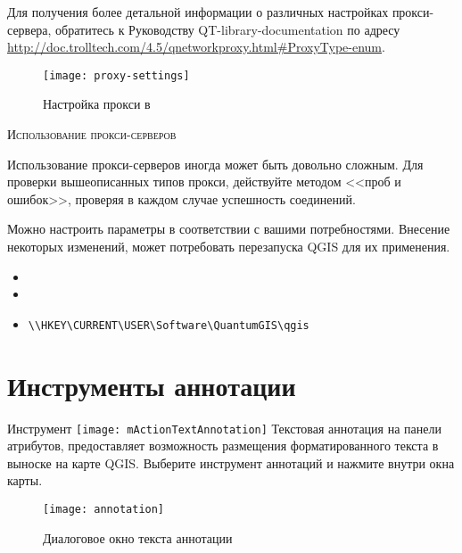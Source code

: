 Для получения более детальной информации о различных настройках прокси-сервера,
обратитесь к Руководству QT-library-documentation по адресу \\
\url{http://doc.trolltech.com/4.5/qnetworkproxy.html#ProxyType-enum}.

\begin{figure}[ht]
   \centering
   \texttt{[image: proxy-settings]}
   \caption{Настройка прокси в \qg \wincaption}
   \label{fig:proxy-settings}
\end{figure}

\begin{Tip} \caption{\textsc{Использование прокси-серверов}}
Использование прокси-серверов иногда может быть довольно сложным. Для
проверки вышеописанных типов прокси, действуйте методом <<проб и ошибок>>,
проверяя в каждом случае успешность соединений.
\end{Tip}

Можно настроить параметры в соответствии с вашими потребностями. Внесение
некоторых изменений, может потребовать перезапуска QGIS для их применения.

\begin{itemize}
\item {}
\item {}
\item {}
\begin{verbatim}
\\HKEY\CURRENT\USER\Software\QuantumGIS\qgis
\end{verbatim}
\end{itemize}

\section{Инструменты аннотации}\label{sec:annotations}

Инструмент \texttt{[image: mActionTextAnnotation]}
Текстовая аннотация на панели атрибутов, предоставляет возможность размещения
форматированного текста в выноске на карте QGIS. Выберите инструмент аннотаций
и нажмите внутри окна карты.

\begin{figure}[ht]
   \centering
   \texttt{[image: annotation]}
   \caption{Диалоговое окно текста аннотации \wincaption}
   \label{fig:annotation}
\end{figure}

